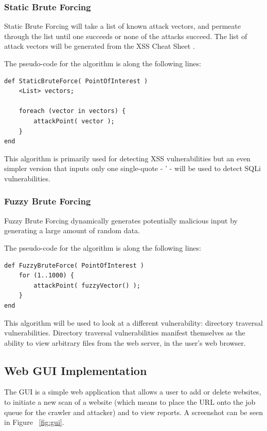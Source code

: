 \documentclass[12pt,a4paper]{article}
\begin{document}
\subsubsection{Static Brute Forcing}
Static Brute Forcing will take a list of known attack vectors, and permeate through the list until one succeeds or none of the attacks succeed.  The list of attack vectors will be generated from the XSS Cheat Sheet \cite{Hansen:2009:Online}.

The pseudo-code for the algorithm is along the following lines:

\begin{lstlisting}
def StaticBruteForce( PointOfInterest )     
    <List> vectors;
    
    foreach (vector in vectors) { 
        attackPoint( vector );
    }
end
\end{lstlisting}

This algorithm is primarily used for detecting XSS vulnerabilities but an even simpler version that inputs only one single-quote - ' - will be used to detect SQLi vulnerabilities.

\subsubsection{Fuzzy Brute Forcing}
Fuzzy Brute Forcing dynamically generates potentially malicious input by generating a large amount of random data. \cite{Sutton2007}

The pseudo-code for the algorithm is along the following lines:

\begin{lstlisting} 
def FuzzyBruteForce( PointOfInterest )
	for (1..1000) { 		
	    attackPoint( fuzzyVector() ); 	
	}
end
\end{lstlisting}
This algorithm will be used to look at a different vulnerability: directory traversal vulnerabilities. Directory traversal vulnerabilities manifest themselves as the ability to view arbitrary files from the web server, in the user's web browser. \cite{OWASP:2007:Online}

\subsection{Web GUI Implementation}
The GUI is a simple web application that allows a user to add or delete websites, to initiate a new scan of a website (which means to place the URL onto the job queue for the crawler and attacker) and to view reports.  A screenshot can be seen in Figure ~\ref{fig:gui}.
\end{document}
